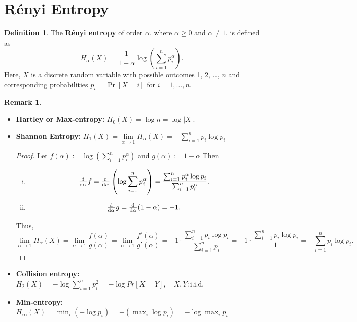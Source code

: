 \documentclass[12pt,openany]{book}
\theoremstyle{definition}
\newtheorem{definition}{Definition}[chapter]
\newtheorem{remark}{Remark}[chapter]
\newcommand{\of}[1]{\left(#1\right)}
\begin{document}
\section{R\'enyi Entropy}
\begin{tcolorbox}[colback=white,colframe=defcolor,arc=5pt,title={\color{white}\bf R\'enyi Entropy}]
	\begin{definition}
		The \textbf{R\'enyi entropy} of order \(\alpha\), where \(\alpha \geq 0\) and \(\alpha \neq 1\), is defined as
		\[ H_{\alpha}(X) = \frac{1}{1 - \alpha} \log \left( \sum_{i=1}^{n} p_i^{\alpha} \right). \]
		Here, \(X\) is a discrete random variable with possible outcomes 1, 2, \ldots, \(n\) and corresponding probabilities \( p_i = \Pr[X = i] \) for \( i = 1, \ldots, n \).
	\end{definition}
\end{tcolorbox}
\begin{remark}
	\ \begin{itemize}
		\item \textbf{Hartley or Max-entropy:} $H_0(X) = \log n = \log |X|.$
		\item \textbf{Shannon Entropy:} $H_1(X)=\lim\limits_{\alpha\to 1}H_{\alpha}(X)=-\sum_{i=1}^np_i\log p_i$
		\begin{proof}
			Let $f(\alpha):=\log\of{\sum_{i=1}^{n}p_i^\alpha}$ and $g(\alpha):=1-\alpha$ Then \begin{enumerate}[(i)]
				\item \[
				\od{}{\alpha}f=\od{}{\alpha}\of{\log\sum_{i=1}^{n}p_i^\alpha}=\frac{\sum_{i=1}^np_i^\alpha\log p_i}{\sum_{i=1}^np_i^\alpha}.
				\]
				\item \[
				\od{}{\alpha}g=\od{}{\alpha}(1-\alpha)=-1.
				\]
			\end{enumerate} Thus, \[
		\lim\limits_{\alpha\to 1}H_\alpha(X)=
		\lim\limits_{\alpha\to 1}\frac{f(\alpha)}{g(\alpha)}=
		\lim\limits_{\alpha\to 1}\frac{f'(\alpha)}{g'(\alpha)}=
		-1\cdot\frac{\sum_{i=1}^np_i\log p_i}{\sum_{i=1}^np_i}=-1\cdot\frac{\sum_{i=1}^np_i\log p_i}{1}=-\sum_{i=1}^np_i\log p_i.
		\]
		\end{proof}
		\item \textbf{Collision entropy:}
		$ H_2(X) = -\log \sum_{i=1}^{n} p_i^2 = -\log Pr[X = Y], \quad X,Y: \text{i.i.d.} $
		\item \textbf{Min-entropy:} $H_{\infty}(X)=\min_i(-\log p_i)=-(\max_i\log p_i)=-\log\max_i p_i$
	\end{itemize}
\end{remark}
\end{document}
